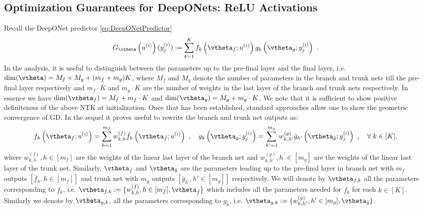 \subsection{Optimization Guarantees for DeepONets: ReLU Activations}\label{subsec:ReLUProofs}
Recall the DeepONet predictor \eqref{eq:DeepONetPredictor}
\begin{equation}
    G_{\vtheta}\left(u^{(i)}\right)(y^{(i)}_j) 
    :=  
    \sum_{k=1}^K f_k \left(\vtheta_f; u^{(i)}\right) 
                 g_k\left(\vtheta_g; y^{(i)}_j\right)~.
    \label{eq:output_DeepONet_Appdx}
\end{equation}
In the analysis, it is useful to distinguish between the parameters up to the pre-final layer and the final layer, i.e. $\dim (\vtheta) = M_f + M_g + (m_f+m_g) K$, where $M_f$ and $M_g$ denote the number of parameters in the branch and trunk nets till the pre-final layer respectively and $m_f \cdot K$ and $m_g\cdot K$ are the number of weights in the last layer of the branch and trunk nets respectively. In essence we have $\dim (\vtheta_f) = M_f + m_f \cdot K$ and  $\dim (\vtheta_g) =  M_g + m_g \cdot K$. 
We note that it is sufficient to show positive definiteness of the above NTK at initialization. Once that has been established, standard approaches \citet{jacot2018neural,du2019gradient,Arora_Du_Neurips_2019,arora2019fine,allen-zhu_convergence_2019} allow one to show the geometric convergence of GD. In the sequel it proves useful to rewrite the branch and trunk net outputs as:
\begin{align}
f_k \left(\vtheta_f; u^{(i)}\right) = \sum_{h=1}^{m_f} w_{k,h}^{(f)} \bar{f}_h \left(\vtheta_{\bar{f}}; u^{(i)}\right) ~, \quad g_k \left(\vtheta_g; y^{(i)}_j \right) = \sum_{h'=1}^{m_g} w_{k,h'}^{(g)} \bar{g}_{h'} \left(\vtheta_{\bar{g}}; y^{(i)}_j \right)~, \quad \forall\; k\in [K],
\label{eq:fkone}
\end{align}
where $w_{k,h}^{(f)}, h \in [m_f]$ are the weights of the linear last layer of the branch net and $w_{k,h'}^{(g)}, h^{\prime} \in [m_g]$ are the weights of the linear last layer of the trunk net. Similarly, $\vtheta_{\bar{f}}$ and $\vtheta_{\bar{g}}$ are the parameters leading up to the pre-final layer in branch net with $m_f$ outputs $[\bar{f}_h, h \in [m_f]]$ and trunk net with $m_g$ outputs $[\bar{g}_{h'}, h' \in [m_g]]$ respectively. We will denote by $\vtheta_{f,k}$ all the parameters corresponding to $f_k$, i.e. $\vtheta_{f,k} := \{ w_{k,h}^{(f)}, h \in [m_f], \vtheta_{\bar{f}} \}$ which includes all the parameters needed for $f_k$ for each $k \in [K]$. Similarly we denote by $\vtheta_{g,k}$, all the parameters corresponding to $g_k$, i.e. $\vtheta_{g,k} := \{ w_{k,h'}^{(g)}, h' \in [m_g], \vtheta_{\bar{g}} \}$.

